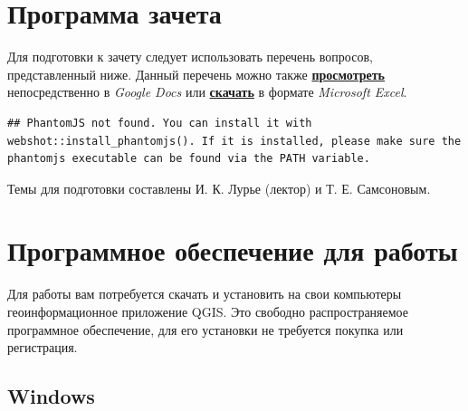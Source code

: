 \documentclass[
  12pt,
]{book}
\begin{document}
\hypertarget{ux43fux440ux43eux433ux440ux430ux43cux43cux430-ux437ux430ux447ux435ux442ux430}{%
\section*{Программа зачета}\label{ux43fux440ux43eux433ux440ux430ux43cux43cux430-ux437ux430ux447ux435ux442ux430}}

Для подготовки к зачету следует использовать перечень вопросов, представленный ниже. Данный перечень можно также \href{https://docs.google.com/spreadsheets/d/1XkEj_3ciispGcWGvSMhCuWBQhmZfvw0JpKXH3_YZemM/edit?usp=sharing}{\textbf{просмотреть}} непосредственно в \emph{Google Docs} или \href{https://docs.google.com/spreadsheets/d/e/2PACX-1vQxLnmOdaCMSpLT-TL9t0F97mzlP-v8njteOoVm1NOijWYle9YQiv8ELWGmehVFNDyesQDyF9TPy63-/pub?output=xlsx}{\textbf{скачать}} в формате \emph{Microsoft Excel}.

\begin{verbatim}
## PhantomJS not found. You can install it with webshot::install_phantomjs(). If it is installed, please make sure the phantomjs executable can be found via the PATH variable.
\end{verbatim}

Темы для подготовки составлены И. К. Лурье (лектор) и Т. Е. Самсоновым.

\hypertarget{ux43fux440ux43eux433ux440ux430ux43cux43cux43dux43eux435-ux43eux431ux435ux441ux43fux435ux447ux435ux43dux438ux435-ux434ux43bux44f-ux440ux430ux431ux43eux442ux44b}{%
\section*{Программное обеспечение для работы}\label{ux43fux440ux43eux433ux440ux430ux43cux43cux43dux43eux435-ux43eux431ux435ux441ux43fux435ux447ux435ux43dux438ux435-ux434ux43bux44f-ux440ux430ux431ux43eux442ux44b}}

Для работы вам потребуется скачать и установить на свои компьютеры геоинформационное приложение QGIS. Это свободно распространяемое программное обеспечение, для его установки не требуется покупка или регистрация.

\hypertarget{windows}{%
\subsection*{Windows}\label{windows}}
\end{document}
